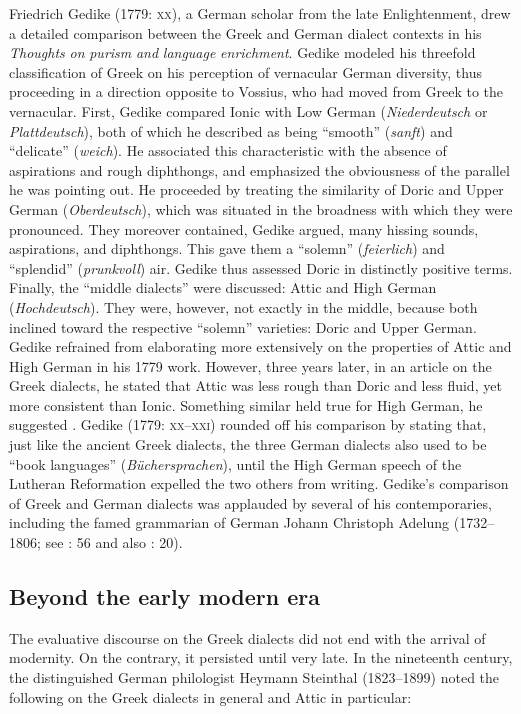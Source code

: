 \documentclass[output=paper]{langsci/langscibook}
\begin{document}
Friedrich Gedike (1779: \textsc{xx}), a German scholar from the late Enlightenment, drew a detailed comparison between the Greek and German dialect contexts in his \textit{Thoughts} \textit{on} \textit{purism} \textit{and} \textit{language} \textit{enrichment}. Gedike modeled his threefold classification of Greek on his perception of vernacular German diversity, thus proceeding in a direction opposite to Vossius, who had moved from Greek to the vernacular. First, Gedike compared Ionic with Low German (\textit{Niederdeutsch} or \textit{Plattdeutsch}), both of which he described as being “smooth” (\textit{sanft}) and “delicate” (\textit{weich}). He associated this characteristic with the absence of aspirations and rough diphthongs, and emphasized the obviousness of the parallel he was pointing out. He proceeded by treating the similarity of Doric and Upper German (\textit{Oberdeutsch}), which was situated in the broadness with which they were pronounced. They moreover contained, Gedike argued, many hissing sounds, aspirations, and diphthongs. This gave them a “solemn” (\textit{feierlich}) and “splendid” (\textit{prunkvoll}) air. Gedike thus assessed Doric in distinctly positive terms. Finally, the “middle dialects” were discussed: Attic and High German (\textit{Hochdeutsch}). They were, however, not exactly in the middle, because both inclined toward the respective “solemn” varieties: Doric and Upper German. Gedike refrained from elaborating more extensively on the properties of Attic and High German in his 1779 work. However, three years later, in an article on the Greek dialects, he stated that Attic was less rough than Doric and less fluid, yet more consistent than Ionic. Something similar held true for High German, he suggested \citep[25]{Gedike1782}. Gedike (1779: \textsc{xx–xxi)} rounded off his comparison by stating that, just like the ancient Greek dialects, the three German dialects also used to be “book languages” (\textit{Büchersprachen}), until the High German speech of the Lutheran Reformation expelled the two others from writing. Gedike’s comparison of Greek and German dialects was applauded by several of his contemporaries, including the famed grammarian of German Johann Christoph Adelung (1732–1806; see \citealt{Adelung1781}: 56 and also \citealt{Moritz1781}: 20).

\subsection{Beyond the early modern era}
\hypertarget{Toc19704853}{}
The evaluative discourse on the Greek dialects did not end with the arrival of modernity. On the contrary, it persisted until very late. In the nineteenth century, the distinguished German philologist Heymann Steinthal (1823–1899) noted the following on the Greek dialects in general and Attic in particular:
\end{document}
